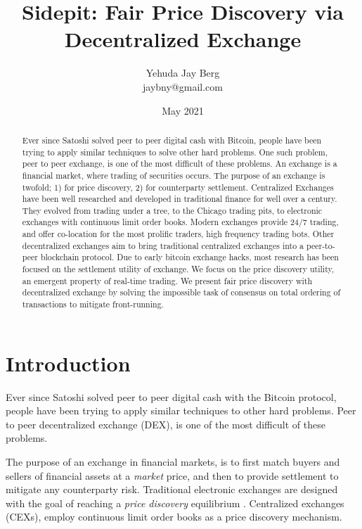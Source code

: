 \documentclass[12pt]{article}
\title{Sidepit: Fair Price Discovery via Decentralized Exchange}
\author{Yehuda Jay Berg \\jaybny@gmail.com}
\date{May 2021}
\begin{document}
\parindent 0cm
\parskip   6pt
\maketitle




\begin{abstract}
Ever since Satoshi solved peer to peer digital cash with Bitcoin, people have been trying to apply similar techniques to solve other hard problems. One such problem, peer to peer exchange, is one of the most difficult of these problems. An exchange is a financial market, where trading of securities occurs. The purpose of an exchange is twofold; 1) for price discovery, 2) for counterparty settlement. Centralized Exchanges have been well researched and developed in traditional finance for well over a century. They evolved from trading under a tree, to the Chicago trading pits, to electronic exchanges with continuous limit order books. Modern exchanges provide 24/7 trading, and offer co-location for the most prolific traders, high frequency trading bots. Other decentralized exchanges aim to bring traditional centralized exchanges into a peer-to-peer blockchain protocol. Due to early bitcoin exchange hacks, most research has been focused on the settlement utility of exchange. We focus on the price discovery utility, an emergent property of real-time trading. We present fair price discovery with decentralized exchange by solving the impossible task of consensus on total ordering of transactions to mitigate front-running. 
\end{abstract}

\section{Introduction}
Ever since Satoshi solved peer to peer digital cash with the Bitcoin protocol, people have been trying to apply similar techniques to other hard problems. Peer to peer decentralized exchange (DEX), is one of the most difficult of these problems. 

The purpose of an exchange in financial markets, is to first match buyers and sellers of financial assets at a \emph{market} price, and then to provide settlement to mitigate any counterparty risk. Traditional electronic exchanges are designed with the goal of reaching a  \emph{price discovery} equilibrium \cite{francioni_schwartz_2017}. Centralized exchanges (CEXs), employ continuous limit order books as a price discovery mechanism. 
\end{document}
